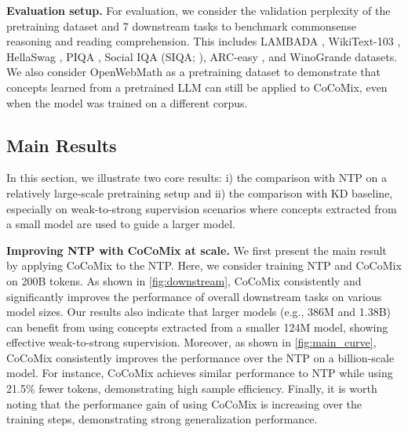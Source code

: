 \documentclass[]{fairmeta}
\newcommand{\sname}{CoCoMix\xspace}
\begin{document}



\textbf{Evaluation setup.} For evaluation, we consider the validation perplexity of the pretraining dataset and 7 downstream tasks to benchmark commonsense reasoning and reading comprehension. This includes LAMBADA \citep{paperno2016lambada}, WikiText-103 \citep{merity2017pointer}, HellaSwag \citep{zellers2019hellaswag}, PIQA \citep{bisk2020piqa}, Social IQA (SIQA; \citealp{sap2019social}), ARC-easy \citep{clark2018think}, and WinoGrande \citep{sakaguchi2020winogrande} datasets. We also consider OpenWebMath \citep{paster2023openwebmath} as a pretraining dataset to demonstrate that concepts learned from a pretrained LLM can still be applied to \sname, even when the model was trained on a different corpus.




\subsection{Main Results}
\label{sec:exp_main}

In this section, we illustrate two core results: i) the comparison with NTP on a relatively large-scale pretraining setup and ii) the comparison with KD baseline, especially on weak-to-strong supervision scenarios where concepts extracted from a small model are used to guide a larger model. 

\textbf{Improving NTP with \sname at scale.}
We first present the main result by applying \sname to the NTP. Here, we consider training NTP and \sname on 200B tokens. As shown in \autoref{fig:downstream}, \sname consistently and significantly improves the performance of overall downstream tasks on various model sizes. Our results also indicate that larger models (e.g., 386M and 1.38B) can benefit from using concepts extracted from a smaller 124M model, showing effective weak-to-strong supervision. Moreover, as shown in \autoref{fig:main_curve}, \sname consistently improves the performance over the NTP on a billion-scale model. For instance, \sname achieves similar performance to NTP while using 21.5\% fewer tokens, demonstrating high sample efficiency. Finally, it is worth noting that the performance gain of using \sname is increasing over the training steps, demonstrating strong generalization performance.
\end{document}
